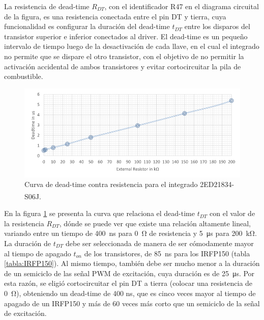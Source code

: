 La resistencia de dead-time $R_{DT}$, con el identificador R47 en el diagrama circuital de la figura, es una resistencia conectada entre el pin DT y tierra, cuya funcionalidad es configurar la duración del dead-time $t_{DT}$ entre los disparos del transistor superior e inferior conectados al driver. El dead-time es un pequeño intervalo de tiempo luego de la desactivación de cada llave, en el cual el integrado no permite que se dispare el otro transistor, con el objetivo de no permitir la activación accidental de ambos transistores y evitar cortocircuitar la pila de combustible.\\

\begin{figure}[h]
    \centering
    \includegraphics[scale=0.5]{Imagenes/Curva Dead-Time.png}
    \caption{Curva de dead-time contra resistencia para el integrado 2ED21834-S06J.\textsuperscript{\cite{DatasheetDriver}}}
    \label{curva_deadtime}
\end{figure}

En la figura \ref{curva_deadtime} se presenta la curva que relaciona el dead-time $t_{DT}$ con el valor de la resistencia $R_{DT}$, dónde se puede ver que existe una relación altamente lineal, variando entre un tiempo de \SI{400}{\nano\second} para \SI[]{0}{\ohm} de resistencia y \SI[]{5}{\micro\second} para \SI[]{200}{\kilo\ohm}.\\

La duración de $t_{DT}$ debe ser seleccionada de manera de ser cómodamente mayor al tiempo de apagado $t_{on}$ de los transistores, de \SI[]{85}{\nano\second} para los IRFP150 (tabla \ref{tabla:IRFP150}). Al mismo tiempo, también debe ser mucho menor a la duración de un semiciclo de las señal PWM de excitación, cuya duración es de \SI[]{25}{\micro\second}. Por esta razón, se eligió {\Medium cortocircuitar el pin DT a tierra} (colocar una resistencia de \SI[]{0}{\ohm}), obteniendo un {\Medium dead-time de 400 ns}, que es cinco veces mayor al tiempo de apagado de un IRFP150 y más de 60 veces más corto que un semiciclo de la señal de excitación.\\


